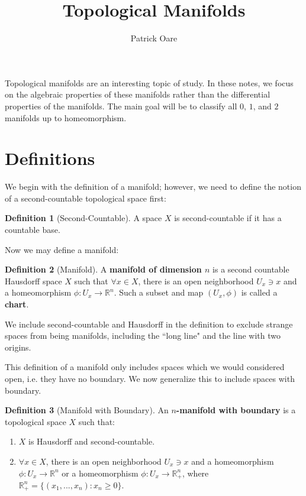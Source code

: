 \documentclass[11pt, oneside]{amsart}   	%
\title{Topological Manifolds}
\author{Patrick Oare}
\date{}							%
\theoremstyle{definition}
\newtheorem{definition}{Definition}[section]
\begin{document}
\maketitle

Topological manifolds are an interesting topic of study. In these notes, we focus on the algebraic properties of these manifolds rather than the differential properties 
of the manifolds. The main goal will be to classify all $0$, $1$, and $2$ manifolds up to homeomorphism.

\section{Definitions}

	We begin with the definition of a manifold; however, we need to define the notion of a second-countable topological space first:
	
	\begin{definition}[Second-Countable]
		A space $X$ is second-countable if it has a countable base.
	\end{definition}
	
	Now we may define a manifold:
	
	\begin{definition}[Manifold]
		A \textbf{manifold of dimension $n$} is a second countable Hausdorff space $X$ such that $\forall x\in X$, there is an open neighborhood $U_x\ni x$ 
		and a homeomorphism $\phi : U_x\rightarrow \mathbb R^n$. Such a subset and map $(U_x, \phi)$ is called a \textbf{chart}. 
	\end{definition}
	
	We include second-countable and Hausdorff in the definition to exclude strange spaces from being manifolds, including the ``long line" and the line with two 
	origins. 
	
	This definition of a manifold only includes spaces which we would considered open, i.e. they have no boundary. We now generalize this to include spaces with 
	boundary.
	
	\begin{definition}[Manifold with Boundary]
		An \textbf{$n$-manifold with boundary} is a topological space $X$ such that:
		\begin{enumerate}
			\item $X$ is Hausdorff and second-countable.
			\item $\forall x\in X$, there is an open neighborhood $U_x\ni x$ and a homeomorphism $\phi : U_x\rightarrow\mathbb R^n$ or a homeomorphism 
			$\phi : U_x\rightarrow\mathbb R^n_+$, where $\mathbb R^n_+ = \{(x_1, ..., x_n) : x_n\geq 0\}$.
		\end{enumerate}
	\end{definition}
	
\end{document}
